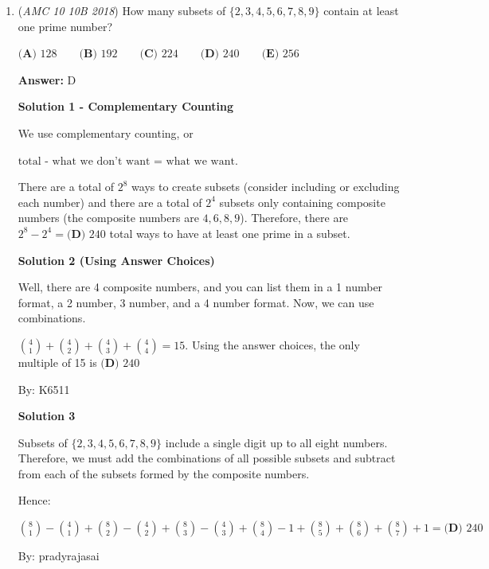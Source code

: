 \begin{enumerate}
 


 


	\item (\textit{AMC 10 10B 2018}) How many subsets of $\{2,3,4,5,6,7,8,9\}$ contain at least one prime number?


 $\textbf{(A) }128 \qquad \textbf{(B) }192 \qquad \textbf{(C) }224 \qquad \textbf{(D) }240 \qquad \textbf{(E) }256 \qquad$

 \textbf{Answer: }D



\textbf{Solution 1 - Complementary Counting}

We use complementary counting, or 

 $\text{total - what we don't want = what we want}$. 

 There are a total of $2^8$ ways to create subsets (consider including or excluding each number) and there are a total of $2^4$ subsets only containing composite numbers (the composite numbers are $4, 6, 8, 9$). Therefore, there are $2^8-2^4=\boxed{\textbf{(D) }240}$ total ways to have at least one prime in a subset.

 



\textbf{Solution 2 (Using Answer Choices)}

Well, there are 4 composite numbers, and you can list them in a 1 number format, a 2 number, 3 number, and a 4 number format. Now, we can use combinations.

 $\binom{4}{1} + \binom{4}{2} + \binom{4}{3} + \binom{4}{4} = 15$. Using the answer choices, the only multiple of 15 is $\boxed{\textbf{(D) }240}$

 By: K6511

 



\textbf{Solution 3}

Subsets of $\{2,3,4,5,6,7,8,9\}$ include a single digit up to all eight numbers. Therefore, we must add the combinations of all possible subsets and subtract from each of the subsets formed by the composite numbers.

 Hence:

 $\binom{8}{1} - \binom{4}{1} + \binom{8}{2} - \binom{4}{2} + \binom{8}{3} - \binom{4}{3} + \binom{8}{4} - 1 + \binom{8}{5} + \binom{8}{6} + \binom{8}{7} + 1 = \boxed{\textbf{(D) }240}$

 By: pradyrajasai

 



\end{enumerate}
